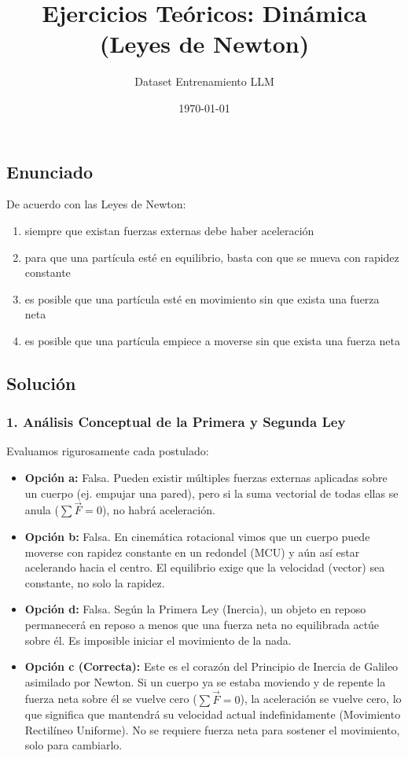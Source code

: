 \documentclass[12pt, a4paper]{article}
\title{Ejercicios Teóricos: Dinámica (Leyes de Newton)}
\author{Dataset Entrenamiento LLM}
\date{\today}
\begin{document}
\maketitle

\subsection*{Enunciado}
De acuerdo con las Leyes de Newton:
\begin{enumerate}[label=\alph*)]
    \item siempre que existan fuerzas externas debe haber aceleración
    \item para que una partícula esté en equilibrio, basta con que se mueva con rapidez constante
    \item es posible que una partícula esté en movimiento sin que exista una fuerza neta
    \item es posible que una partícula empiece a moverse sin que exista una fuerza neta
\end{enumerate}

\subsection*{Solución}

\subsubsection*{1. Análisis Conceptual de la Primera y Segunda Ley}
Evaluamos rigurosamente cada postulado:
\begin{itemize}
    \item \textbf{Opción a:} Falsa. Pueden existir múltiples fuerzas externas aplicadas sobre un cuerpo (ej. empujar una pared), pero si la suma vectorial de todas ellas se anula ($\sum \vec{F} = 0$), no habrá aceleración.
    \item \textbf{Opción b:} Falsa. En cinemática rotacional vimos que un cuerpo puede moverse con rapidez constante en un redondel (MCU) y aún así estar acelerando hacia el centro. El equilibrio exige que la velocidad (vector) sea constante, no solo la rapidez.
    \item \textbf{Opción d:} Falsa. Según la Primera Ley (Inercia), un objeto en reposo permanecerá en reposo a menos que una fuerza neta no equilibrada actúe sobre él. Es imposible iniciar el movimiento de la nada.
    \item \textbf{Opción c (Correcta):} Este es el corazón del Principio de Inercia de Galileo asimilado por Newton. Si un cuerpo ya se estaba moviendo y de repente la fuerza neta sobre él se vuelve cero ($\sum \vec{F} = 0$), la aceleración se vuelve cero, lo que significa que mantendrá su velocidad actual indefinidamente (Movimiento Rectilíneo Uniforme). No se requiere fuerza neta para sostener el movimiento, solo para cambiarlo.
\end{itemize}
\end{document}

